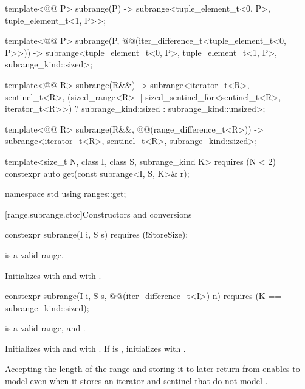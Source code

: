 \begin{codeblock}
{  template<@@ P>
    subrange(P) -> subrange<tuple_element_t<0, P>, tuple_element_t<1, P>>;

  template<@@ P>
    subrange(P, @@(iter_difference_t<tuple_element_t<0, P>>)) ->
      subrange<tuple_element_t<0, P>, tuple_element_t<1, P>, subrange_kind::sized>;

  template<@@ R>
    subrange(R&&) ->
      subrange<iterator_t<R>, sentinel_t<R>,
               (sized_range<R> || sized_sentinel_for<sentinel_t<R>, iterator_t<R>>)
                 ? subrange_kind::sized : subrange_kind::unsized>;

  template<@@ R>
    subrange(R&&, @@(range_difference_t<R>)) ->
      subrange<iterator_t<R>, sentinel_t<R>, subrange_kind::sized>;

  template<size_t N, class I, class S, subrange_kind K>
    requires (N < 2)
  constexpr auto get(const subrange<I, S, K>& r);
}

namespace std {
  using ranges::get;
}
\end{codeblock}

[range.subrange.ctor]{Constructors and conversions}

%
\begin{itemdecl}
constexpr subrange(I i, S s) requires (!StoreSize);
\end{itemdecl}

\begin{itemdescr}
\pnum
\expects {} is a valid range.

\pnum
\effects Initializes  with  and  with
.
\end{itemdescr}

%
\begin{itemdecl}
constexpr subrange(I i, S s, @@(iter_difference_t<I>) n)
  requires (K == subrange_kind::sized);
\end{itemdecl}

\begin{itemdescr}
\pnum
\expects {} is a valid range, and
.

\pnum
\effects Initializes  with  and  with
. If  is , initializes  with
.

\pnum
\begin{note}
Accepting the length of the range and storing it to later return  from
 enables  to model  even
when it stores an iterator and sentinel that do not model
.
\end{note}
\end{itemdescr}


